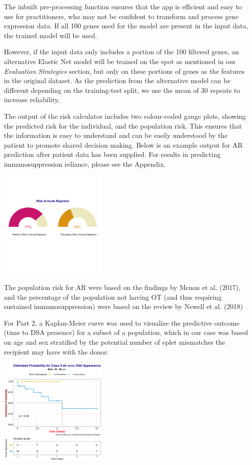 \documentclass[a4paper,9pt,twocolumn,twoside,]{pinp}
\begin{document}
The inbuilt pre-processing function ensures that the app is efficient
and easy to use for practitioners, who may not be confident to transform
and process gene expression data. If all 100 genes used for the model
are present in the input data, the trained model will be used.

However, if the input data only includes a portion of the 100 filtered
genes, an alternative Elastic Net model will be trained on the spot as
mentioned in our \emph{Evaluation Strategies} section, but only on these
portions of genes as the features in the original dataset. As the
prediction from the alternative model can be different depending on the
training-test split, we use the mean of 30 repeats to increase
reliability.

The output of the risk calculator includes two colour-coded gauge plots,
showing the predicted risk for the individual, and the population risk.
This ensures that the information is easy to understand and can be
easily understood by the patient to promote shared decision making.
Below is an example output for AR prediction after patient data has been
supplied. For results in predicting immunosuppression reliance, please
see the Appendix.

\begin{center}\includegraphics[width=200px]{images/part1_gauge} \end{center}

The population risk for AR were based on the findings by Menon et al.
(2017), and the percentage of the population not having OT (and thus
requiring sustained immunosuppression) were based on the review by
Newell et al. (2018)

For Part 2, a Kaplan-Meier curve was used to visualize the predictive
outcome (time to DSA presence) for a subset of a population, which in
our case was based on age and sex stratified by the potential number of
eplet mismatches the recipient may have with the donor.

\begin{center}\includegraphics[width=200px]{images/part2survival} \end{center}
\end{document}
